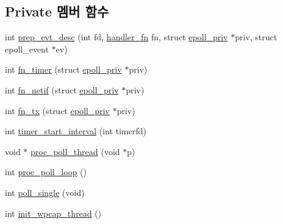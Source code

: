 \subsection*{Private 멤버 함수}
\begin{DoxyCompactItemize}
\item 
int \hyperlink{classavdecc__lib_1_1system__layer2__multithreaded__callback_ad45575cb73c470467150d44e2051ceb6}{prep\+\_\+evt\+\_\+desc} (int fd, \hyperlink{classavdecc__lib_1_1system__layer2__multithreaded__callback_aead26f50f9ac63097d31fcf8235ad693}{handler\+\_\+fn} fn, struct \hyperlink{structavdecc__lib_1_1system__layer2__multithreaded__callback_1_1epoll__priv}{epoll\+\_\+priv} $\ast$priv, struct epoll\+\_\+event $\ast$ev)
\item 
int \hyperlink{classavdecc__lib_1_1system__layer2__multithreaded__callback_a31827beb4f4d9ee65747b3d7df4f9369}{fn\+\_\+timer} (struct \hyperlink{structavdecc__lib_1_1system__layer2__multithreaded__callback_1_1epoll__priv}{epoll\+\_\+priv} $\ast$priv)
\item 
int \hyperlink{classavdecc__lib_1_1system__layer2__multithreaded__callback_a5f2abae24cc383c43a31ca88ffcebab1}{fn\+\_\+netif} (struct \hyperlink{structavdecc__lib_1_1system__layer2__multithreaded__callback_1_1epoll__priv}{epoll\+\_\+priv} $\ast$priv)
\item 
int \hyperlink{classavdecc__lib_1_1system__layer2__multithreaded__callback_a7fee5b5184ef1af0d14bd5451b62516d}{fn\+\_\+tx} (struct \hyperlink{structavdecc__lib_1_1system__layer2__multithreaded__callback_1_1epoll__priv}{epoll\+\_\+priv} $\ast$priv)
\item 
int \hyperlink{classavdecc__lib_1_1system__layer2__multithreaded__callback_ae921ed6f4870489118b852f37e353a1e}{timer\+\_\+start\+\_\+interval} (int timerfd)
\item 
void $\ast$ \hyperlink{classavdecc__lib_1_1system__layer2__multithreaded__callback_a566d3a80483ff476552c0ae2fd319448}{proc\+\_\+poll\+\_\+thread} (void $\ast$p)
\item 
int \hyperlink{classavdecc__lib_1_1system__layer2__multithreaded__callback_a09e472b0088f22960c0441c5245097b8}{proc\+\_\+poll\+\_\+loop} ()
\item 
int \hyperlink{classavdecc__lib_1_1system__layer2__multithreaded__callback_aeec60d44f88ac359719331fd77ee3d14}{poll\+\_\+single} (void)
\item 
int \hyperlink{classavdecc__lib_1_1system__layer2__multithreaded__callback_afbfb3e5823d8f6f0e012dc1b21e2deae}{init\+\_\+wpcap\+\_\+thread} ()
\item 

\end{DoxyCompactItemize}
